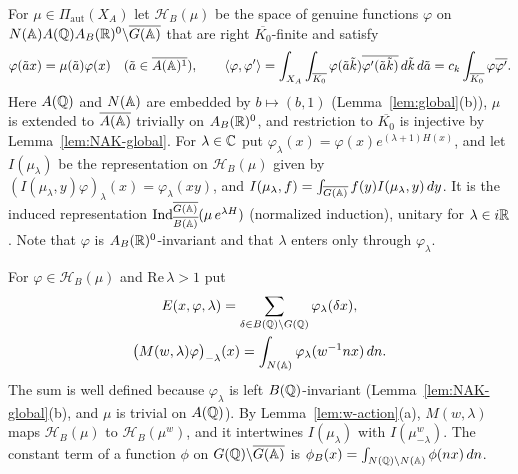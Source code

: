 For $\mu\in\Pi_{\mathrm{aut}}(X_A)$ let $\mathcal H_B(\mu)$ be the space of
genuine functions $\varphi$ on $N(\mathbb{A})A(\mathbb{Q})A_B(\mathbb{R})^0\backslash\overline{G(\mathbb{A})}$ that are
right $\overline{K_0}$-finite and satisfy
\begin{equation}\label{eq:HBmu}
\varphi(\tilde a x)=\mu(\tilde a)\varphi(x)\quad(\tilde a\in
\overline{A(\mathbb{A})^1}),\qquad
\langle\varphi,\varphi'\rangle=\int_{X_A}\int_{\overline{K_0}}
\varphi(\tilde a\tilde k)\overline{\varphi'(\tilde a\tilde k)}\,d\tilde k\,
d\tilde a=c_k\int_{\overline{K_0}}\varphi\overline{\varphi'}.
\end{equation}
Here $A(\mathbb{Q})$ and $N(\mathbb{A})$ are embedded by $b\mapsto(b,1)$
(Lemma~\ref{lem:global}(b)), $\mu$ is extended to $\overline{A(\mathbb{A})}$
trivially on $A_B(\mathbb{R})^0$, and restriction to $\overline{K_0}$ is injective
by Lemma~\ref{lem:NAK-global}. For $\lambda\in\mathbb{C}$ put
$\varphi_\lambda(x)=\varphi(x)e^{(\lambda+1)H(x)}$, and let
$I(\mu_\lambda)$ be the representation on $\mathcal H_B(\mu)$ given by
$(I(\mu_\lambda,y)\varphi)_\lambda(x)=\varphi_\lambda(xy)$, and
$I(\mu_\lambda,f)=\int_{\overline{G(\mathbb{A})}}f(y)I(\mu_\lambda,y)\,dy$. It is the induced
representation $\operatorname{Ind}_{\overline{B(\mathbb{A})}}^{\overline{G(\mathbb{A})}}(\mu\,e^{\lambda H})$
(normalized induction), unitary for $\lambda\in i\mathbb{R}$. Note that
$\varphi$ is $A_B(\mathbb{R})^0$-invariant and that $\lambda$ enters only through
$\varphi_\lambda$.

For $\varphi\in\mathcal H_B(\mu)$ and $\mathrm{Re}\,\lambda>1$ put
\begin{gather}
E(x,\varphi,\lambda)=\sum_{\delta\in B(\mathbb{Q})\backslash G(\mathbb{Q})}
\varphi_\lambda(\delta x),\label{eq:Eis}\\
\bigl(M(w,\lambda)\varphi\bigr)_{-\lambda}(x)=\int_{N(\mathbb{A})}
\varphi_\lambda(w^{-1}nx)\,dn .\label{eq:Mw}
\end{gather}
The sum is well defined because $\varphi_\lambda$ is left
$B(\mathbb{Q})$-invariant (Lemma~\ref{lem:NAK-global}(b), and $\mu$ is trivial
on $A(\mathbb{Q})$). By Lemma~\ref{lem:w-action}(a), $M(w,\lambda)$ maps
$\mathcal H_B(\mu)$ to $\mathcal H_B(\mu^w)$, and it intertwines
$I(\mu_\lambda)$ with $I(\mu^w_{-\lambda})$. The constant term of a
function $\phi$ on $G(\mathbb{Q})\backslash\overline{G(\mathbb{A})}$ is $\phi_B(x)=\int_{N(\mathbb{Q})
\backslash N(\mathbb{A})}\phi(nx)\,dn$.


